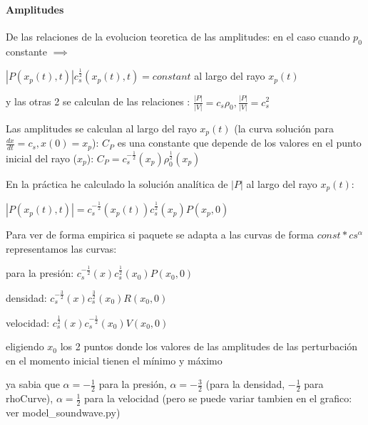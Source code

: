 \documentclass{article}
\begin{document}
\paragraph{Amplitudes}
\begin{description}
\item De las relaciones de  la evolucion teoretica de las amplitudes: en el caso cuando $ p_0$ constante $\implies$  
\item $|P(x_p(t),t)| c_s^{\frac{1}{2}}(x_p(t),t) = constant $ al largo del rayo $x_p(t)$
\item y las otras 2 se calculan de las relaciones : $\frac{|P|}{|V|} = c_s \rho_0 , \frac{|P|}{|V|} = c_s^2$
\item Las amplitudes se calculan al largo del rayo  $x_p(t)$ (la curva solución para  $\frac{dx}{dt} = c_s, x(0) = x_p$): $C_P$ es una constante que depende de los valores en el punto inicial del rayo ($x_p$): $C_P = c_s^{-\frac{1}{2}}(x_p) \rho_0^{\frac{1}{2}}(x_p)$

\item En la práctica he calculado la solución analítica de $|P|$ al largo del rayo $x_p(t)$:
\item $|P(x_p(t),t)| = c_s^{-\frac{1}{2}}(x_p(t)) c_s^{\frac{1}{2}}(x_p) P(x_p,0)  $
\item Para ver de forma empirica si paquete se adapta  a las curvas de forma  $const * cs^{\alpha} $representamos las curvas:
\item para la presión: $ c_s^{-\frac{1}{2}}(x) c_s^{\frac{1}{2}}(x_0) P(x_0,0) $
\item densidad: $ c_s^{-\frac{3}{2}}(x) c_s^{\frac{3}{2}}(x_0) R(x_0,0)  $ 
\item velocidad: $ c_s^{\frac{1}{2}}(x) c_s^{-\frac{1}{2}}(x_0) V(x_0,0)  $ 
\item eligiendo $x_0$ los 2 puntos donde  los valores de las amplitudes de las perturbación en el momento inicial tienen el mínimo y máximo 
\item ya sabia que $\alpha = -\frac{1}{2}$ para la presión, $\alpha = -\frac{3}{2}$ (para la densidad, $-\frac{1}{2}$ para rhoCurve), $\alpha = \frac{1}{2}$ para la velocidad (pero se puede variar tambien en el grafico: ver model\_soundwave.py)
\end{description}
\end{document}
